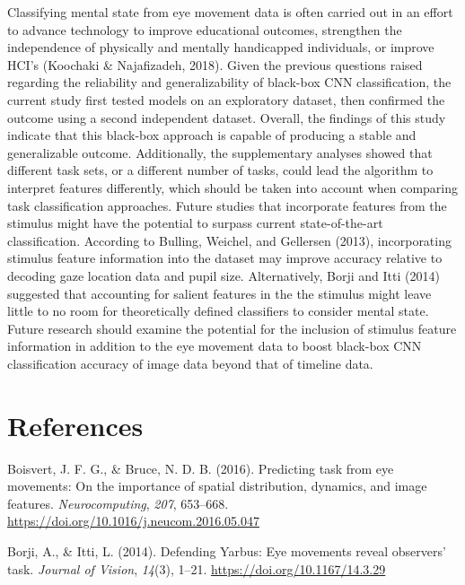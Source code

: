 \documentclass[
  english,
  man, donotrepeattitle,floatsintext]{apa6}
\begin{document}
Classifying mental state from eye movement data is often carried out in an effort to advance technology to improve educational outcomes, strengthen the independence of physically and mentally handicapped individuals, or improve HCI's (Koochaki \& Najafizadeh, 2018). Given the previous questions raised regarding the reliability and generalizability of black-box CNN classification, the current study first tested models on an exploratory dataset, then confirmed the outcome using a second independent dataset. Overall, the findings of this study indicate that this black-box approach is capable of producing a stable and generalizable outcome. Additionally, the supplementary analyses showed that different task sets, or a different number of tasks, could lead the algorithm to interpret features differently, which should be taken into account when comparing task classification approaches. Future studies that incorporate features from the stimulus might have the potential to surpass current state-of-the-art classification. According to Bulling, Weichel, and Gellersen (2013), incorporating stimulus feature information into the dataset may improve accuracy relative to decoding gaze location data and pupil size. Alternatively, Borji and Itti (2014) suggested that accounting for salient features in the the stimulus might leave little to no room for theoretically defined classifiers to consider mental state. Future research should examine the potential for the inclusion of stimulus feature information in addition to the eye movement data to boost black-box CNN classification accuracy of image data beyond that of timeline data.

\newpage

\hypertarget{references}{%
\section{References}\label{references}}

\begingroup
\setlength{\parindent}{-0.5in}
\setlength{\leftskip}{0.5in}

\hypertarget{refs}{}
\leavevmode\hypertarget{ref-boisvertPredictingTaskEye2016a}{}%
Boisvert, J. F. G., \& Bruce, N. D. B. (2016). Predicting task from eye movements: On the importance of spatial distribution, dynamics, and image features. \emph{Neurocomputing}, \emph{207}, 653--668. \url{https://doi.org/10.1016/j.neucom.2016.05.047}

\leavevmode\hypertarget{ref-borjiDefendingYarbusEye2014}{}%
Borji, A., \& Itti, L. (2014). Defending Yarbus: Eye movements reveal observers' task. \emph{Journal of Vision}, \emph{14}(3), 1--21. \url{https://doi.org/10.1167/14.3.29}
\end{document}
